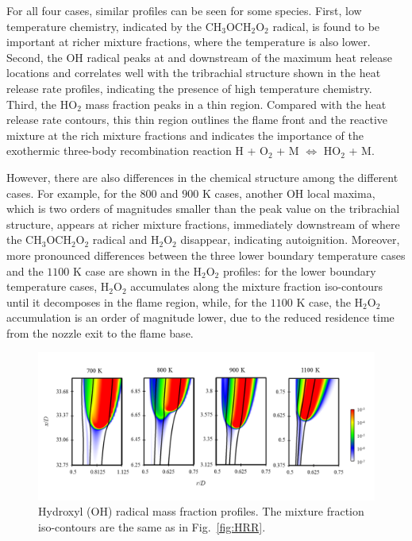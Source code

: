 \documentclass[review,3p,times]{elsarticle}
\begin{document}
For all four cases, similar profiles can be seen for some species.  \textcolor{mycolor}{First, low temperature chemistry, indicated by the CH$_3$OCH$_2$O$_2$ radical, is found to be important at richer mixture fractions, where the temperature is also lower.  Second, the OH radical peaks at and downstream of the maximum heat release locations and correlates well with the tribrachial structure shown in the heat release rate profiles, indicating the presence of high temperature chemistry.}  Third, the HO$_2$ mass fraction peaks in a thin region.  Compared with the heat release rate contours, this thin region outlines the flame front and the reactive mixture at the rich mixture fractions and indicates the importance of the exothermic three-body recombination reaction H + O$_2$ + M $\Longleftrightarrow$ HO$_2$ + M.

However, there are also differences in the chemical structure among the different cases.  For example, for the $800$ and $900$ K cases, another OH local maxima, which is two orders of magnitudes smaller than the peak value on the tribrachial structure, appears at richer mixture fractions, immediately downstream of where the CH$_3$OCH$_2$O$_2$ radical and H$_2$O$_2$ disappear, indicating autoignition.  Moreover, more pronounced differences between the three lower boundary temperature cases and the $1100$ K case are shown in the H$_2$O$_2$ profiles: for the lower boundary temperature cases, H$_2$O$_2$ accumulates along the mixture fraction iso-contours  until it decomposes in the flame region, while, for the $1100$ K case, the H$_2$O$_2$ accumulation is an order of magnitude lower, due to the reduced residence time from the nozzle exit to the flame base.
  

\begin{figure}[t]
  \centering
  \scriptsize
  \vspace{-0.1in}
  \includegraphics[width=1.0\textwidth]{OH.png}
  \normalsize
  \vspace{-0.1in}
  \caption{Hydroxyl (OH) radical mass fraction profiles.  The mixture fraction iso-contours are the same as in Fig.~\ref{fig:HRR}.}
  \label{fig:OH}
\end{figure}
\end{document}
